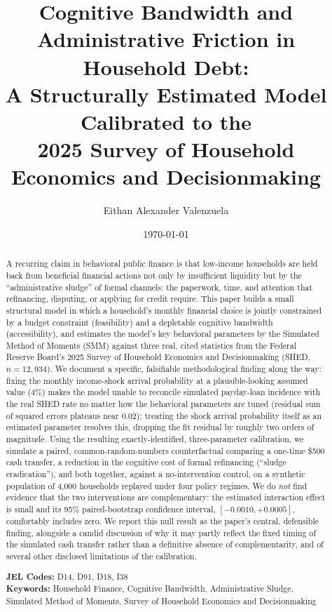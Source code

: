 \documentclass[12pt]{article}
\title{Cognitive Bandwidth and Administrative Friction in Household Debt:\\
A Structurally Estimated Model Calibrated to the\\
2025 Survey of Household Economics and Decisionmaking}
\author{Eithan Alexander Valenzuela}
\affil{Independent Research}
\date{\today}
\begin{document}
\maketitle

\begin{abstract}
\noindent A recurring claim in behavioral public finance is that low-income households are held back from beneficial financial actions not only by insufficient liquidity but by the ``administrative sludge'' of formal channels: the paperwork, time, and attention that refinancing, disputing, or applying for credit require. This paper builds a small structural model in which a household's monthly financial choice is jointly constrained by a budget constraint (feasibility) and a depletable cognitive bandwidth (accessibility), and estimates the model's key behavioral parameters by the Simulated Method of Moments (SMM) against three real, cited statistics from the Federal Reserve Board's 2025 Survey of Household Economics and Decisionmaking (SHED, $n=12{,}934$). We document a specific, falsifiable methodological finding along the way: fixing the monthly income-shock arrival probability at a plausible-looking assumed value (4\%) makes the model unable to reconcile simulated payday-loan incidence with the real SHED rate no matter how the behavioral parameters are tuned (residual sum of squared errors plateaus near $0.02$); treating the shock arrival probability itself as an estimated parameter resolves this, dropping the fit residual by roughly two orders of magnitude. Using the resulting exactly-identified, three-parameter calibration, we simulate a paired, common-random-numbers counterfactual comparing a one-time \$500 cash transfer, a reduction in the cognitive cost of formal refinancing (``sludge eradication''), and both together, against a no-intervention control, on a synthetic population of 4,000 households replayed under four policy regimes. We do \emph{not} find evidence that the two interventions are complementary: the estimated interaction effect is small and its 95\% paired-bootstrap confidence interval, $[-0.0010, +0.0005]$, comfortably includes zero. We report this null result as the paper's central, defensible finding, alongside a candid discussion of why it may partly reflect the fixed timing of the simulated cash transfer rather than a definitive absence of complementarity, and of several other disclosed limitations of the calibration.

\vspace{0.5cm}
\noindent \textbf{JEL Codes:} D14, D91, D18, I38 \\
\textbf{Keywords:} Household Finance, Cognitive Bandwidth, Administrative Sludge, Simulated Method of Moments, Survey of Household Economics and Decisionmaking
\end{abstract}
\end{document}
